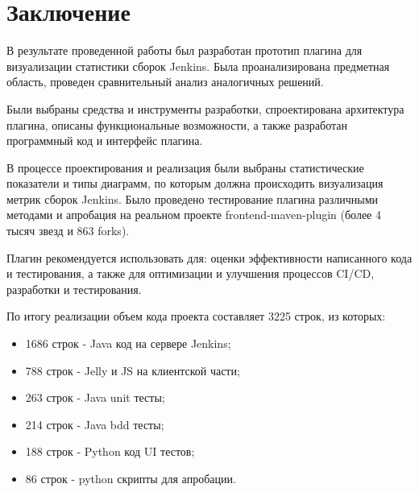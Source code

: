 \chapter*{Заключение} \label{ch-conclusion}

В результате проведенной работы был разработан прототип плагина для визуализации статистики сборок Jenkins. Была проанализирована предметная область, проведен сравнительный анализ аналогичных решений.

Были выбраны средства и инструменты разработки, спроектирована архитектура плагина, описаны функциональные возможности, а также разработан программный код и интерфейс плагина.

В процессе проектирования и реализация были выбраны статистические показатели и типы диаграмм, по которым должна происходить визуализация метрик сборок Jenkins. Было проведено тестирование плагина различными методами и апробация на реальном проекте frontend-maven-plugin (более 4 тысяч звезд и 863 forks).

Плагин рекомендуется использовать для: оценки эффективности написанного кода и тестирования, а также для оптимизации и улучшения процессов CI/CD, разработки и тестирования.

По итогу реализации объем кода проекта составляет 3225 строк, из которых:

\begin{itemize}
	\item 1686 строк  - Java код на сервере Jenkins;
	\item 788 строк - Jelly и JS на клиентской части;
	\item 263 строк - Java unit тесты;
	\item 214 строк - Java bdd тесты;
	\item 188 строк - Python код UI тестов;
	\item 86 строк - python скрипты для апробации.
\end{itemize}
